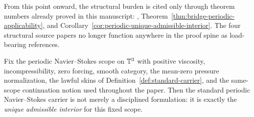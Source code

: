\begin{remark}\label{rem:carrier-packet-citation-discipline}
From this point onward, the structural burden is cited only through theorem numbers already proved in this manuscript: \StructuralPacketRef{}, Theorem~\ref{thm:bridge-periodic-applicability}, and Corollary~\ref{cor:periodic-unique-admissible-interior}. The four structural source papers no longer function anywhere in the proof spine as load-bearing references.
\end{remark}

\begin{manualtheorem}
\label{thm:periodic-carrier-unique-interior}
Fix the periodic Navier--Stokes scope on $\mathbb{T}^3$ with positive viscosity, incompressibility, zero
forcing, smooth category, the mean-zero pressure normalization, the lawful skins of
Definition~\ref{def:standard-carrier}, and the same-scope continuation notion used throughout the
paper. Then the standard periodic Navier--Stokes carrier is not merely a disciplined formulation: it
is exactly the \emph{unique admissible interior} for this fixed scope.
\end{manualtheorem}

